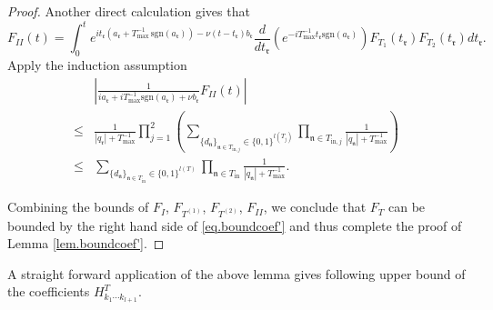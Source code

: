 \begin{proof}
Another direct calculation gives that 
\begin{equation}
    F_{II}(t)=\int^t_0  e^{it_{\mathfrak{r}}(a_{\mathfrak{r}}+T^{-1}_{\text{max}}\, \text{sgn}(a_{\mathfrak{r}}))- \nu(t-t_{\mathfrak{r}})b_{\mathfrak{r}}} \frac{d}{dt_{\mathfrak{r}}}(e^{-iT^{-1}_{\text{max}}t_{\mathfrak{r}} \text{sgn}(a_{\mathfrak{r}})})  F_{T_1}(t_{\mathfrak{r}})F_{T_2}(t_{\mathfrak{r}}) dt_{\mathfrak{r}}.
\end{equation}
Apply the induction assumption
\begin{equation}
\begin{split}
    &\left| \frac{1}{ia_{\mathfrak{r}}+iT^{-1}_{\text{max}} \text{sgn}(a_{\mathfrak{r}})+\nu b_{\mathfrak{r}} } F_{II}(t)\right|
    \\
    \le& \frac{1}{|q_{\mathfrak{r}}|+T^{-1}_{\text{max}}}\prod_{j=1}^2\left(\sum_{\{d_{\mathfrak{n}}\}_{\mathfrak{n}\in T_{\text{in},j}}\in\{0,1\}^{l(T_j)}}\prod_{\mathfrak{n}\in T_{\text{in},j}}\frac{1}{|q_{\mathfrak{n}}|+T^{-1}_{\text{max}}}\right)
    \\
    \le& \sum_{\{d_{\mathfrak{n}}\}_{\mathfrak{n}\in T_{\text{in}}}\in\{0,1\}^{l(T)}}\prod_{\mathfrak{n}\in T_{\text{in}}}\frac{1}{|q_{\mathfrak{n}}|+T^{-1}_{\text{max}}}.
\end{split}
\end{equation}

Combining the bounds of $F_{I}$, $F_{T^{(1)}}$, $F_{T^{(2)}}$, $F_{II}$, we conclude that $F_T$ can be bounded by the right hand side of \eqref{eq.boundcoef'} and thus complete the proof of Lemma \ref{lem.boundcoef'}.
\end{proof}
 





A straight forward application of the above lemma gives following upper bound of the coefficients $H^T_{k_1\cdots k_{l+1}}$. 


